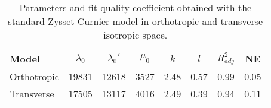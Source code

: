 \begin{table}[!h]
\centering
\caption{Parameters and fit quality coefficient obtained with the standard Zysset-Curnier model in orthotropic and transverse isotropic space.}
\label{TabZysset}
\begin{tabular}{l|c|c|c|c|c|c|c}
\toprule
      Model & $\lambda_0$ & $\lambda_0'$ & $\mu_0$ &  $k$ &  $l$ & $R^2_{adj}$ &   NE \\
\midrule
Orthotropic &       19831 &        12618 &    3527 & 2.48 & 0.57 &        0.99 & 0.05 \\
 Transverse &       17505 &        13117 &    4016 & 2.49 & 0.39 &        0.94 & 0.11 \\
\bottomrule
\end{tabular}
\end{table}
